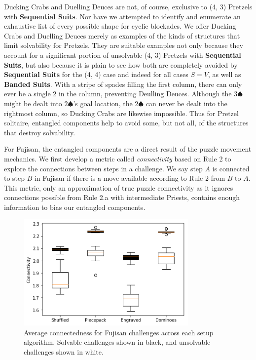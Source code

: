 \documentclass[journal]{IEEEtran}
\begin{document}
Ducking Crabs and Duelling Deuces are not, of course, exclusive to (4, 3) Pretzels with \textbf{Sequential Suits}. Nor have we attempted to identify and enumerate an exhaustive list of every possible shape for cyclic blockades. We offer Ducking Crabs and Duelling Deuces merely as examples of the kinds of structures that limit solvability for Pretzels. They are suitable examples not only because they account for a significant portion of unsolvable (4, 3) Pretzels with \textbf{Sequential Suits}, but also because it is plain to see how both are completely avoided by \textbf{Sequential Suits} for the (4, 4) case and indeed for all cases $S = V$, as well as \textbf{Banded Suits}. With a stripe of spades filling the first column, there can only ever be a single 2 in the column, preventing Deulling Deuces. Although the $3\spadesuit$ might be dealt into $2\spadesuit$'s goal location, the $2\spadesuit$ can never be dealt into the rightmost column, so Ducking Crabs are likewise impossible. Thus for Pretzel solitaire, entangled components help to avoid some, but not all, of the structures that destroy solvability.

For Fujisan, the entangled components are a direct result of the puzzle movement mechanics. We first develop a metric called {\it connectivity} based on Rule 2 to explore the connections between steps in a challenge. We say step $A$ is connected to step $B$ in Fujisan if there is a move available according to Rule 2 from $B$ to $A$. This metric, only an approximation of true puzzle connectivity as it ignores connections possible from Rule 2.a with intermediate Priests, contains enough information to bias our entangled components.

\begin{figure}[t]
\includegraphics[width=8.8cm]{figure19.png}
\caption{Average connectedness for Fujisan challenges across each setup algorithm. 
Solvable challenges shown in black, and unsolvable challenges shown in white.}
\label{fig:connected}
\end{figure}
\end{document}
